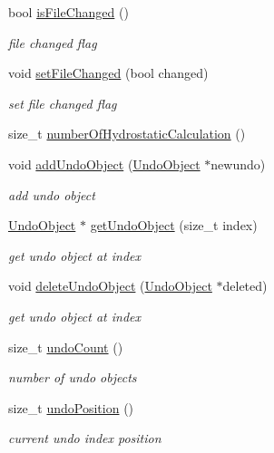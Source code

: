 \begin{DoxyCompactItemize}
bool \hyperlink{classShipCAD_1_1ShipCADModel_a2cf41d2e7463763c81c7850fe953437e}{is\-File\-Changed} ()
\begin{DoxyCompactList}\small\item\em file changed flag \end{DoxyCompactList}\item 
void \hyperlink{classShipCAD_1_1ShipCADModel_a98ebcb64c5c759cbd0ae6e817b7168b2}{set\-File\-Changed} (bool changed)
\begin{DoxyCompactList}\small\item\em set file changed flag \end{DoxyCompactList}\item 
size\-\_\-t \hyperlink{classShipCAD_1_1ShipCADModel_a0ce90a8c9a7ee50253cf20426bb8a8d9}{number\-Of\-Hydrostatic\-Calculation} ()
\item 
void \hyperlink{classShipCAD_1_1ShipCADModel_ab79232c9ce03bda04f47ff614f87cea4}{add\-Undo\-Object} (\hyperlink{classShipCAD_1_1UndoObject}{Undo\-Object} $\ast$newundo)
\begin{DoxyCompactList}\small\item\em add undo object \end{DoxyCompactList}\item 
\hyperlink{classShipCAD_1_1UndoObject}{Undo\-Object} $\ast$ \hyperlink{classShipCAD_1_1ShipCADModel_a0acb4ae206e2caee0f87ebd229b7c90b}{get\-Undo\-Object} (size\-\_\-t index)
\begin{DoxyCompactList}\small\item\em get undo object at index \end{DoxyCompactList}\item 
void \hyperlink{classShipCAD_1_1ShipCADModel_a0c14ab36acacc74411446a65ffadaa06}{delete\-Undo\-Object} (\hyperlink{classShipCAD_1_1UndoObject}{Undo\-Object} $\ast$deleted)
\begin{DoxyCompactList}\small\item\em get undo object at index \end{DoxyCompactList}\item 
size\-\_\-t \hyperlink{classShipCAD_1_1ShipCADModel_a1d7ffa7d873dc1f43d21a62054ae356c}{undo\-Count} ()
\begin{DoxyCompactList}\small\item\em number of undo objects \end{DoxyCompactList}\item 
size\-\_\-t \hyperlink{classShipCAD_1_1ShipCADModel_a28d6c179e54a1e19997a0da2a38e4ca5}{undo\-Position} ()
\begin{DoxyCompactList}\small\item\em current undo index position \end{DoxyCompactList}\item 

\end{DoxyCompactItemize}
